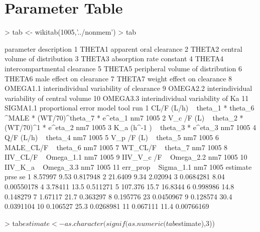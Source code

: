 \section{Parameter Table}
\begin{Schunk}
\begin{Sinput}
> tab <- wikitab(1005,'../nonmem')
> tab
\end{Sinput}
\begin{Soutput}
   parameter                                   description
1     THETA1                       apparent oral clearance
2     THETA2                central volume of distribution
3     THETA3                      absorption rate constant
4     THETA4                  intercompartmental clearance
5     THETA5             peripheral volume of distribution
6     THETA6                      male effect on clearance
7     THETA7                    weight effect on clearance
8   OMEGA1.1      interindividual variability of clearance
9   OMEGA2.2 interindividual variability of central volume
10  OMEGA3.3             interindividual variability of Ka
11  SIGMA1.1                            proportional error
                                                                model tool  run
1  CL/F (L/h) ~ theta_1 *  theta_6 ^MALE * (WT/70)^theta_7  * e^eta_1  nm7 1005
2                          V_c /F (L) ~ theta_2 * (WT/70)^1 * e^eta_2  nm7 1005
3                                     K_a (h^-1 ) ~ theta_3 * e^eta_3  nm7 1005
4                                                 Q/F (L/h) ~ theta_4  nm7 1005
5                                                V_p /F (L) ~ theta_5  nm7 1005
6                                                 MALE_CL/F ~ theta_6  nm7 1005
7                                                   WT_CL/F ~ theta_7  nm7 1005
8                                                IIV_CL/F ~ Omega_1.1  nm7 1005
9                                              IIV_V_c /F ~ Omega_2.2  nm7 1005
10                                               IIV_K_a  ~ Omega_3.3  nm7 1005
11                                               err_prop ~ Sigma_1.1  nm7 1005
    estimate prse         se
1    8.57997 9.53   0.817948
2    21.6409 9.34    2.02094
3  0.0684281 8.04 0.00550178
4    3.78411 13.5   0.511271
5    107.376 15.7    16.8344
6   0.998986 14.8   0.148279
7    1.67117 21.7   0.363297
8   0.195776   23  0.0450967
9   0.128574 30.4  0.0391104
10  0.106527 25.3  0.0268981
11  0.067111 11.4 0.00766169
\end{Soutput}
\begin{Sinput}
> tab$estimate <- as.character(signif(as.numeric(tab$estimate),3))

\end{Sinput}
\end{Schunk}
